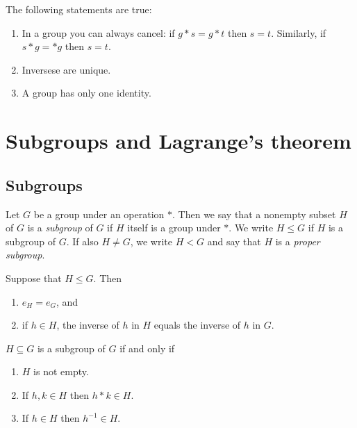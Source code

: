 \documentclass{article}
\begin{document}
\setcounter{theorem}{7}
\begin{corollary}
    The following statements are true:
    \begin{enumerate}
        \item In a group you can always cancel: if $g* s=g* t$
              then $s=t$. Similarly, if $s* g=* g$ then $s=t$.
        \item Inversese are unique.
        \item A group has only one identity.
    \end{enumerate}
\end{corollary}


\section{Subgroups and Lagrange's theorem}


\subsection{Subgroups}

\begin{definition}
    Let $G$ be a group under an operation $*$. Then we say that a nonempty
    subset $H$ of $G$ is a \emph{subgroup} of $G$ if $H$ itself is a group under $*$.
    We write $H\leq G$ if $H$ is a subgroup of $G$. If also $H\not=G$, we write
    $H<G$ and say that $H$ is a \emph{proper subgroup}.
\end{definition}

\begin{lemma}
    Suppose that $H\leq G$. Then
    \begin{enumerate}
        \item $e_H = e_G$, and
        \item if $h\in H$, the inverse of $h$ in $H$ equals the inverse of $h$ in $G$.
    \end{enumerate}
\end{lemma}

\begin{theorem}
    $H\subseteq G$ is a subgroup of $G$ if and only if
    \begin{enumerate}[label=S\arabic*.]
        \item $H$ is not empty.
        \item If $h,k\in H$ then $h*k\in H$.
        \item If $h\in H$ then $h^{-1}\in H$.
    \end{enumerate}
\end{theorem}
\end{document}
